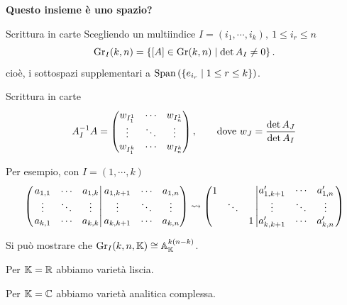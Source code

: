 \documentclass[a4paper]{beamer}
\begin{document}
\begin{frame}{}
\begin{center}
{\Large \textbf{Questo insieme \`e uno spazio?}}
\end{center}
\end{frame}

\begin{frame}{Scrittura in carte}
Scegliendo un multiindice $I=(i_1,\cdots, i_k),\ 1\leq i_r\leq n$
\[\mathrm{Gr}_I(k,n)=\left\{{[A]\in \mathrm{Gr}(k,n)\mid \det A_I\neq 0}\right\}.\]
cio\`e, i sottospazi supplementari a $\mathrm{Span}\,(\left\{{e_{i_r}\mid 1\leq r\leq k}\right\})$.\pause

\begin{center}
\end{center}
\end{frame}



\begin{frame}{Scrittura in carte}
\[A_I^{-1} A=\begin{pmatrix}
w_{I^1_{1}} & \cdots & w_{I^1_n}\\
\vdots      & \ddots & \vdots\\
w_{I^k_{1}} & \cdots & w_{I^k_n}
\end{pmatrix},\qquad\text{dove }w_J=\frac{\det A_J}{\det A_I}\]

Per esempio, con $I=(1,\cdots, k)$
\[\left(\left.
\begin{matrix}
a_{1,1} & \cdots & a_{1,k}\\
\vdots & \ddots &\vdots\\
a_{k,1} & \cdots & a_{k,k}
\end{matrix}\right|
\begin{matrix}
a_{1,k+1} &\cdots & a_{1,n}\\
\vdots &\ddots & \vdots\\
a_{k,k+1} &\cdots & a_{k,n}
\end{matrix}\right)
\leadsto
\left( \begin{matrix}1&&\\&\ddots&\\&&1\end{matrix}\left| \begin{matrix}
a'_{1,k+1} & \cdots & a'_{1,n}\\
\vdots & \ddots &\vdots\\
a'_{k,k+1} & \cdots & a'_{k,n}
\end{matrix}\right.\right)\]
\medskip
\pause

Si pu\`o mostrare che $\mathrm{Gr}_I(k,n,\mathbb{K})\cong \mathbb{A}_{\mathbb{K}}^{k(n-k)}$.\bigskip
\pause

Per $\mathbb{K}=\mathbb{R}$ abbiamo variet\`a liscia.

Per $\mathbb{K}=\mathbb{C}$ abbiamo variet\`a analitica complessa.
\end{frame}
\end{document}
